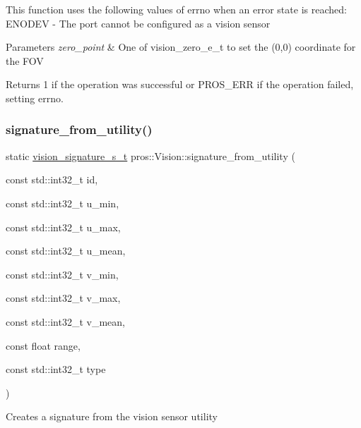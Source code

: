 This function uses the following values of errno when an error state is reached\+: E\+N\+O\+D\+EV -\/ The port cannot be configured as a vision sensor


\begin{DoxyParams}{Parameters}
{\em zero\+\_\+point} & One of vision\+\_\+zero\+\_\+e\+\_\+t to set the (0,0) coordinate for the F\+OV\\
\hline
\end{DoxyParams}
\begin{DoxyReturn}{Returns}
1 if the operation was successful or P\+R\+O\+S\+\_\+\+E\+RR if the operation failed, setting errno. 
\end{DoxyReturn}
\mbox{\label{classpros_1_1Vision_aa46f3bfb4956c7061b34764c92fc68fd}} 
\subsubsection{\texorpdfstring{signature\+\_\+from\+\_\+utility()}{signature\_from\_utility()}}
{\footnotesize\ttfamily static \hyperlink{vision_8h_a135c729c7277f6cc019c2924088a5fd5}{vision\+\_\+signature\+\_\+s\+\_\+t} pros\+::\+Vision\+::signature\+\_\+from\+\_\+utility (\begin{DoxyParamCaption}\item[{const std\+::int32\+\_\+t}]{id,  }\item[{const std\+::int32\+\_\+t}]{u\+\_\+min,  }\item[{const std\+::int32\+\_\+t}]{u\+\_\+max,  }\item[{const std\+::int32\+\_\+t}]{u\+\_\+mean,  }\item[{const std\+::int32\+\_\+t}]{v\+\_\+min,  }\item[{const std\+::int32\+\_\+t}]{v\+\_\+max,  }\item[{const std\+::int32\+\_\+t}]{v\+\_\+mean,  }\item[{const float}]{range,  }\item[{const std\+::int32\+\_\+t}]{type }\end{DoxyParamCaption})\hspace{0.3cm}{\ttfamily [static]}}

Creates a signature from the vision sensor utility


